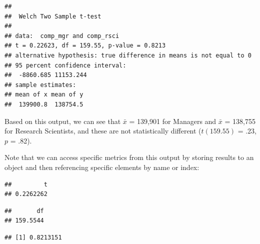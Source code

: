 \documentclass[]{book}
\newenvironment{Shaded}{\begin{snugshade}}{\end{snugshade}}
\newcommand{\CommentTok}[1]{\textcolor[rgb]{0.56,0.35,0.01}{\textit{#1}}}
\newcommand{\KeywordTok}[1]{\textcolor[rgb]{0.13,0.29,0.53}{\textbf{#1}}}
\newcommand{\NormalTok}[1]{#1}
\newcommand{\OperatorTok}[1]{\textcolor[rgb]{0.81,0.36,0.00}{\textbf{#1}}}
\newcommand{\StringTok}[1]{\textcolor[rgb]{0.31,0.60,0.02}{#1}}
\begin{document}
\begin{verbatim}
## 
##  Welch Two Sample t-test
## 
## data:  comp_mgr and comp_rsci
## t = 0.22623, df = 159.55, p-value = 0.8213
## alternative hypothesis: true difference in means is not equal to 0
## 95 percent confidence interval:
##  -8860.685 11153.244
## sample estimates:
## mean of x mean of y 
##  139900.8  138754.5
\end{verbatim}

Based on this output, we can see that \(\bar{x}\) = 139,901 for Managers and \(\bar{x}\) = 138,755 for Research Scientists, and these are not statistically different (\(t(159.55)\) = .23, \(p\) = .82).

Note that we can access specific metrics from this output by storing results to an object and then referencing specific elements by name or index:

\begin{Shaded}
\end{Shaded}

\begin{verbatim}
##         t 
## 0.2262262
\end{verbatim}

\begin{Shaded}
\end{Shaded}

\begin{verbatim}
##       df 
## 159.5544
\end{verbatim}

\begin{Shaded}
\end{Shaded}

\begin{verbatim}
## [1] 0.8213151
\end{verbatim}
\end{document}
